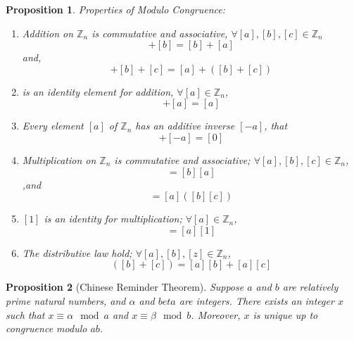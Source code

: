 \documentclass[12pt]{article}
\newtheorem{proposition}{Proposition}[subsection]
\begin{document}
    \begin{proposition}
        Properties of Modulo Congruence:\\
        \begin{enumerate}
            \item Addition on $\mathbb{Z}_n$ is commutative and associative, $\forall [a], [b], [c] \in \mathbb{Z}_n$
                \begin{equation}
                   [a]+[b]=[b]+[a]
                \end{equation}
                and,
                \begin{equation}
                    [a]+[b]+[c] = [a]+([b]+[c])
                \end{equation}
            \item [0] is an identity element for addition, $\forall [a] \in \mathbb{Z}_n$,
                \begin{equation}
                    [0]+[a]=[a]
                \end{equation}
            \item Every element $[a]$ of $\mathbb{Z}_n$ has an additive inverse $[-a]$, that
                \begin{equation}
                    [a] + [-a] = [0]
                \end{equation}

            \item Multiplication on $\mathbb{Z}_n$ is commutative and associative; $\forall [a], [b], [c] \in \mathbb{Z}_n$,
                \begin{equation}
                    [a][b] = [b][a]
                \end{equation}
                ,and
                \begin{equation}
                    [a][b][c] = [a]([b][c])
                \end{equation}
            \item $[1]$ is an identity for multiplication; $\forall [a] \in \mathbb{Z}_n$,
                \begin{equation}
                    [1][a] = [a][1]
                \end{equation}
            \item The distributive law hold; $\forall [a], [b], [z] \in \mathbb{Z}_n$,
                \begin{equation}
                    [a]([b]+[c]) = [a][b] + [a][c]
                \end{equation}
        \end{enumerate}
    \end{proposition}

    \begin{proposition}[Chinese Reminder Theorem]
        Suppose $a$ and $b$ are relatively prime natural numbers, and $\alpha$ and $beta$ are integers. There exists an integer $x$ such that $x \equiv \alpha \mod a$ and $x \equiv \beta \mod b$. Moreover, $x$ is unique up to congruence modulo $ab$.
    \end{proposition}
\end{document}
